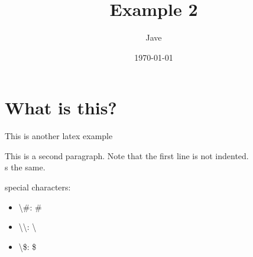 \documentclass[letterpaper, 12pt]{article}
\begin{document}
\date{\today}
\title{Example 2}
\author{Jave}
\maketitle
\section{What is this?}
This is another latex example

This is a second paragraph. Note that the first line is not indented.\\ %
s the same.

\noindent special characters:
\begin{itemize}
    \item \textbackslash{}\#: \#           
    \item \textbackslash{}\textbackslash: \textbackslash 
    \item \textbackslash{}\$: \$            
\end{itemize}
\end{document}
